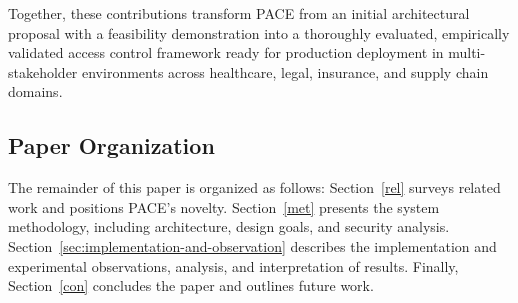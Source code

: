 \documentclass[pdflatex,sn-mathphys-num]{sn-jnl}
\begin{document}
Together, these contributions transform PACE from an initial architectural proposal with a feasibility demonstration into a thoroughly evaluated, empirically validated access control framework ready for production deployment in multi-stakeholder environments across healthcare, legal, insurance, and supply chain domains.

\subsection{Paper Organization}

The remainder of this paper is organized as follows: Section~\ref{rel} surveys related work and positions PACE's novelty. Section~\ref{met} presents the system methodology, including architecture, design goals, and security analysis. Section~\ref{sec:implementation-and-observation} describes the implementation and experimental observations, analysis, and interpretation of results. Finally, Section~\ref{con} concludes the paper and outlines future work.
\end{document}
